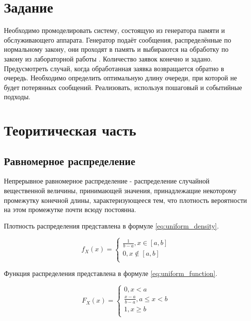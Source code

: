 \documentclass[a4paper, 12pt]{article}
\begin{document}
\section{{Задание}}

\hspace*{5mm} Необходимо промоделировать систему, состоящую из генератора памяти и обслуживающего аппарата. Генератор подаёт сообщения, распределённые по нормальному закону, они проходят в память и выбираются на обработку по закону из лабораторной работы . Количество заявок конечно и задано. Предусмотреть случай, когда обработанная заявка возвращается обратно в очередь. Необходимо определить оптимальную длину очереди, при которой не будет потерянных сообщений. Реализовать, используя пошаговый и событийные подходы.

\section{{Теоритическая часть}}
\subsection{Равномерное распределение}

\hspace*{5mm} Непрерывное равномерное распределение - распределение случайной вещественной величины, принимающей значения, принадлежащие некоторому промежутку конечной длины, характеризующееся тем, что плотность вероятности на этом промежутке почти всюду постоянна.

Плотность распределения представлена в формуле \ref{eq:uniform_density}.

\begin{equation}\label{eq:uniform_density}
	f_X (x) =
	\begin{cases}
		\frac{1}{b-a}, x \in [a,b] \\
		0, x \notin [a, b] \\
	\end{cases}
\end{equation}

Функция распределения представлена в формуле \ref{eq:uniform_function}.

\begin{equation}\label{eq:uniform_function}
	F_X (x) =
	\begin{cases}
		0, x < a \\
		\frac{x - a}{b - a}, a \le x < b \\
		1, x \geq b \\
	\end{cases}
\end{equation}
\end{document}
